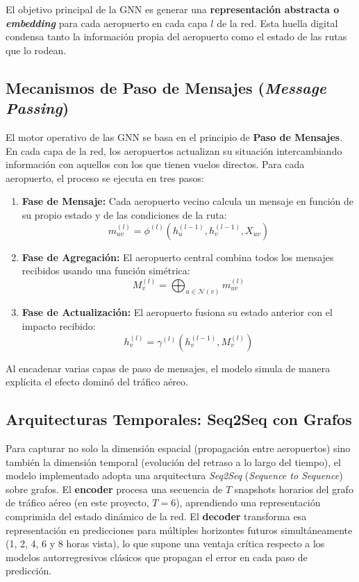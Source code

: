 \documentclass[12pt,oneside,a4paper]{report}
\renewcommand{\_}{\textunderscore\allowbreak}
\begin{document}
El objetivo principal de la GNN es generar una \textbf{representación abstracta o \textit{embedding}} para cada aeropuerto en cada capa $l$ de la red. Esta huella digital condensa tanto la información propia del aeropuerto como el estado de las rutas que lo rodean.

\subsection{Mecanismos de Paso de Mensajes (\textit{Message Passing})}
\label{sub:message_passing}

El motor operativo de las GNN se basa en el principio de \textbf{Paso de Mensajes}. En cada capa de la red, los aeropuertos actualizan su situación intercambiando información con aquellos con los que tienen vuelos directos. Para cada aeropuerto, el proceso se ejecuta en tres pasos:

\begin{enumerate}
    \item \textbf{Fase de Mensaje:} Cada aeropuerto vecino calcula un mensaje en función de su propio estado y de las condiciones de la ruta:
    \[
    m_{uv}^{(l)} = \phi^{(l)} \left( h_u^{(l-1)}, h_v^{(l-1)}, X_{uv} \right)
    \]

    \item \textbf{Fase de Agregación:} El aeropuerto central combina todos los mensajes recibidos usando una función simétrica:
    \[
    M_v^{(l)} = \bigoplus_{u \in \mathcal{N}(v)} m_{uv}^{(l)}
    \]

    \item \textbf{Fase de Actualización:} El aeropuerto fusiona su estado anterior con el impacto recibido:
    \[
    h_v^{(l)} = \gamma^{(l)} \left( h_v^{(l-1)}, M_v^{(l)} \right)
    \]
\end{enumerate}

Al encadenar varias capas de paso de mensajes, el modelo simula de manera explícita el efecto dominó del tráfico aéreo.

\subsection{Arquitecturas Temporales: Seq2Seq con Grafos}
\label{sub:seq2seq}

Para capturar no solo la dimensión espacial (propagación entre aeropuertos) sino también la dimensión temporal (evolución del retraso a lo largo del tiempo), el modelo implementado adopta una arquitectura \textit{Seq2Seq} (\textit{Sequence to Sequence}) sobre grafos. El \textbf{encoder} procesa una secuencia de $T$ snapshots horarios del grafo de tráfico aéreo (en este proyecto, $T=6$), aprendiendo una representación comprimida del estado dinámico de la red. El \textbf{decoder} transforma esa representación en predicciones para múltiples horizontes futuros simultáneamente (1, 2, 4, 6 y 8 horas vista), lo que supone una ventaja crítica respecto a los modelos autorregresivos clásicos que propagan el error en cada paso de predicción.
\end{document}
